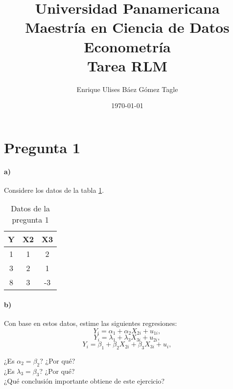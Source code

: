 \documentclass[10pt]{article}
\title{Universidad Panamericana \\ Maestría en Ciencia de Datos \\ Econometría \\ \vspace{0.5cm} Tarea RLM}
\author{Enrique Ulises Báez Gómez Tagle}
\date{\today}
\begin{document}
\maketitle

\tableofcontents

\newpage
\section{Pregunta 1}
\paragraph*{a)} Considere los datos de la tabla \ref{tab:datos_pregunta1}.
\begin{table}[H]
    \centering
    \begin{tabular}{ccc}
        Y & X2 & X3 \\
        \hline
        1 & 1 & 2 \\
        3 & 2 & 1 \\
        8 & 3 & -3 \\
        \hline
    \end{tabular}
    \caption{Datos de la pregunta 1}
    \label{tab:datos_pregunta1}
\end{table}

\paragraph*{b)} Con base en estos datos, estime las siguientes regresiones:
    \[
        Y_i=\alpha_1+\alpha_2X_{2i}+u_{1i},
    \]
    \[
        Y_i=\lambda_1+\lambda_3X_{3i}+u_{2i},
    \]
    \[
        Y_i=\beta_1+\beta_2X_{2i}+\beta_3X_{3i}+u_i,
    \]

     ¿Es $\alpha_2 = \beta_2$? ¿Por qué? \\

     ¿Es $\lambda_3 = \beta_3$? ¿Por qué? \\

     ¿Qué conclusión importante obtiene de este ejercicio? \\  
\end{document}
